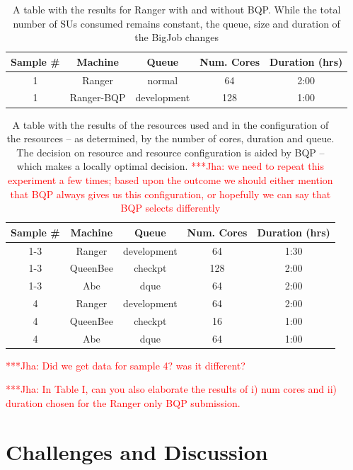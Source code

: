 \documentclass[conference,final]{IEEEtran}
\newcommand{\jhanote}[1]{ {\textcolor{red} { ***Jha: #1 }}}
\newcommand{\jhanote}[1]{}
\begin{document}
\begin{table}
\begin{tabular}{|c|c|c|c|c|}
\hline Sample \# & Machine & Queue & Num. Cores & Duration (hrs) \\ 
\hline 1 & Ranger & normal & 64 & 2:00 \\ 
\hline 1 & Ranger-BQP & development & 128 & 1:00 \\ 
\hline 
\end{tabular} 
\caption{A table with the results for Ranger with and without BQP. While the
    total number of SUs consumed remains constant, the queue, size and duration
    of the BigJob changes}
\end{table}


\begin{table}
\begin{tabular}{|c|c|c|c|c|}
\hline Sample \# & Machine & Queue & Num. Cores & Duration (hrs) \\ 
\hline 1-3 & Ranger & development & 64 & 1:30 \\ 
\hline 1-3 & QueenBee & checkpt & 128 & 2:00 \\ 
\hline 1-3 & Abe & dque & 64 & 2:00 \\ 
\hline 4 & Ranger & development & 64 & 2:00 \\ 
\hline 4 & QueenBee & checkpt & 16 & 1:00 \\ 
\hline 4 & Abe & dque & 64 & 1:00 \\ 
\hline 
\end{tabular} 
\caption{A table with the results of the resources used and in
  the configuration of the resources -- as determined, by the
  number of cores, duration and queue. The decision on
  resource and resource configuration is aided by BQP -- which 
  makes a locally optimal decision. \jhanote{we need to repeat
    this experiment a few times; based upon the outcome we should either
    mention that BQP always gives us this configuration, or hopefully we
    can say that BQP selects differently}}
\end{table}

\jhanote{Did we get data for sample 4? was it different?}

\jhanote{In Table I, can you also elaborate the results of i) num cores and
ii) duration chosen for the Ranger only BQP submission.}



\section{Challenges and Discussion}
\end{document}
